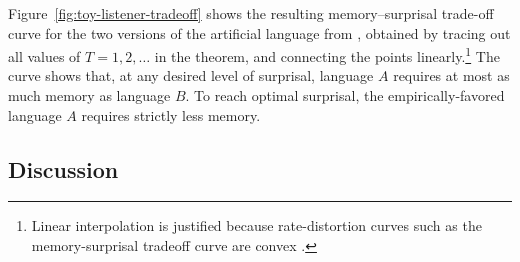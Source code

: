 Figure~\ref{fig:toy-listener-tradeoff} shows the resulting memory--surprisal trade-off curve for the two versions of the artificial language from \cite{fedzechkina-human-2017}, obtained by tracing out all values of $T=1, 2, \dots$ in the theorem, and connecting the points linearly.\footnote{Linear interpolation is justified because rate-distortion curves such as the memory-surprisal tradeoff curve are convex \citep{berger2003rate}.}
The curve shows that, at any desired level of surprisal, language $A$ requires at most as much memory as language $B$.
To reach optimal surprisal, the empirically-favored language $A$ requires strictly less memory.







%
%
%
%
%
%
%
%
%
%
%




\subsection{Discussion}

